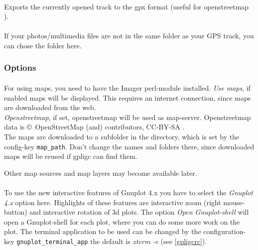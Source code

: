 \paragraph{%
}
Exports the currently opened track to the gpx format (useful for openstreetmap \cite{osm}).

\paragraph{%
}
If your photos/multimedia files are not in the same folder as your GPS track, you can chose the folder here.



\subsubsection{Options}

\paragraph{%
}
For using maps, you need to have the Imager perl-module installed.
\emph{Use maps}, if enabled maps will be displayed.
This requires an internet connection, since maps are downloaded from the web.\\
\emph{Openstreetmap}, if set, openstreetmap will be used as map-server.
Openstreetmap data is \copyright\ OpenStreetMap (and) contributors, CC-BY-SA \cite{osm}.\\

The maps are downloaded to a subfolder in the directory, which is set by the config-key \texttt{map\_path}.
Don't change the names and folders there, since downloaded maps will be reused if gpligc can find them.

Other map sources and map layers may become available later.




\paragraph{
}
To use the new interactive features of Gnuplot 4.x you have to select the \emph{Gnuplot 4.x} option here. Highlights of these features are interactive zoom (right mouse-button) and interactive rotation of 3d plots.
The option \emph{Open Gnuplot-shell} will open a Gnuplot-shell for each plot, where you can do some more work on the plot. The  terminal application to be used can be changed by the configuration-key \texttt{gnuplot\_terminal\_app} the default is \emph{xterm -e} (see \ref{gpligcrc}).

